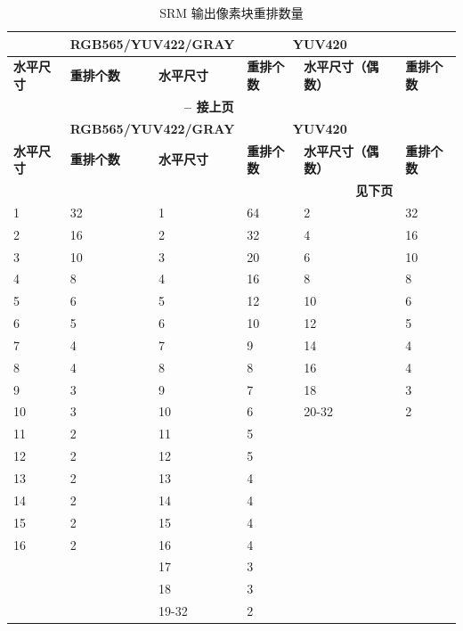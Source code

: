\documentclass[main\_\_CN.tex]{subfiles}
\begin{document}
\begin{longtable}[c]{ |p{2cm}|p{2cm}|p{2cm}|p{2cm}|p{2cm}|p{2cm}| }
    \caption{SRM 输出像素块重排数量}
    \label{tab:srm_blk_ro_num}\\\hline

    \rowcolor{lightgray}
    \multicolumn{2}{|c|}{\textbf{ARGB8888/RGB888}} & \multicolumn{2}{c|}{\textbf{RGB565/YUV422/GRAY}} & \multicolumn{2}{c|}{\textbf{YUV420}} \\\hline
    \rowcolor{lightgray}
    \textbf{水平尺寸} & \textbf{重排个数} & \textbf{水平尺寸} & \textbf{重排个数} & \textbf{水平尺寸（偶数）} & \textbf{重排个数} \\\hline
    \endfirsthead


    \multicolumn{5}{c}{\bfseries \tablename\ \thetable{} -- 接上页}\\\hline
    \rowcolor{lightgray}
    \multicolumn{2}{|c|}{\textbf{ARGB8888/RGB888}} & \multicolumn{2}{c|}{\textbf{RGB565/YUV422/GRAY}} & \multicolumn{2}{c|}{\textbf{YUV420}} \\\hline
    \rowcolor{lightgray}
    \textbf{水平尺寸} & \textbf{重排个数} & \textbf{水平尺寸} & \textbf{重排个数} & \textbf{水平尺寸（偶数）} & \textbf{重排个数} \\\hline
    \endhead

    \multicolumn{5}{r}{\textbf{见下页}} \\
    \endfoot

    \endlastfoot

        1  & 32 & 1  & 64 & 2  & 32 \\\hline
        2  & 16 & 2  & 32 & 4  & 16 \\\hline
        3  & 10 & 3  & 20 & 6  & 10 \\\hline
        4  & 8  & 4  & 16 & 8  & 8  \\\hline
        5  & 6  & 5  & 12 & 10 & 6  \\\hline
        6  & 5  & 6  & 10 & 12 & 5  \\\hline
        7  & 4  & 7  & 9  & 14 & 4  \\\hline
        8  & 4  & 8  & 8  & 16 & 4  \\\hline
        9  & 3  & 9  & 7  & 18 & 3  \\\hline
        10 & 3  & 10 & 6  & 20-32 & 2 \\\hline
        11 & 2  & 11 & 5  &  &  \\\hline
        12 & 2  & 12 & 5  &  &  \\\hline
        13 & 2  & 13 & 4  &  &  \\\hline
        14 & 2  & 14 & 4  &  &  \\\hline
        15 & 2  & 15 & 4  &  &  \\\hline
        16 & 2  & 16 & 4  &  &  \\\hline
           &    & 17 & 3  &  &  \\\hline
           &    & 18 & 3  &  &  \\\hline
           &    & 19-32 & 2 &  &  \\\hline

\end{longtable}
\end{document}
